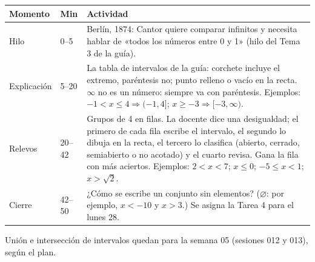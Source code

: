 \documentclass[11pt]{article}
\begin{document}
\begin{center}
{\renewcommand{\arraystretch}{1.3}
\begin{tabularx}{\linewidth}{@{}l l X@{}}
  \toprule
  \textbf{Momento} & \textbf{Min} & \textbf{Actividad}\\
  \midrule
  Hilo & 0–5 & Berlín, 1874: Cantor quiere comparar infinitos y necesita hablar de «todos los
    números entre 0 y 1» (hilo del Tema 3 de la guía).\\
  Explicación & 5–20 & La tabla de intervalos de la guía: corchete incluye el extremo,
    paréntesis no; punto relleno o vacío en la recta. $\infty$ no es un número: siempre va con
    paréntesis. Ejemplos: $-1 < x \le 4 \Rightarrow (-1, 4]$; $x \ge -3 \Rightarrow
    [-3, \infty)$.\\
  Relevos & 20–42 & Grupos de 4 en filas. La docente dice una desigualdad; el primero de cada
    fila escribe el intervalo, el segundo lo dibuja en la recta, el tercero lo clasifica
    (abierto, cerrado, semiabierto o no acotado) y el cuarto revisa. Gana la fila con más
    aciertos. Ejemplos: $2 < x < 7$; $x \le 0$; $-5 \le x < 1$; $x > \sqrt{2}$.\\
  Cierre & 42–50 & ¿Cómo se escribe un conjunto sin elementos? ($\varnothing$: por ejemplo,
    $x < -10$ y $x > 3$.) Se asigna la Tarea 4 para el lunes 28.\\
  \bottomrule
\end{tabularx}}
\end{center}

\begin{nota}
Unión e intersección de intervalos quedan para la semana 05 (sesiones 012 y 013), según el
plan.
\end{nota}
\end{document}
